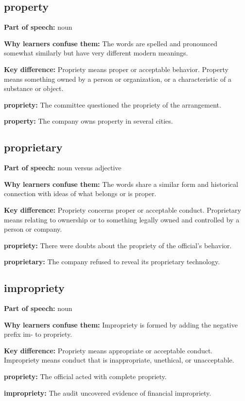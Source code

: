 \documentclass[11pt]{article}
\begin{document}
\subsection{property}
\textbf{Part of speech:} noun

\textbf{Why learners confuse them:} The words are spelled and pronounced somewhat similarly but have very different modern meanings.

\textbf{Key difference:} Propriety means proper or acceptable behavior. Property means something owned by a person or organization, or a characteristic of a substance or object.

\textbf{propriety:} The committee questioned the propriety of the arrangement.

\textbf{property:} The company owns property in several cities.

\subsection{proprietary}
\textbf{Part of speech:} noun versus adjective

\textbf{Why learners confuse them:} The words share a similar form and historical connection with ideas of what belongs or is proper.

\textbf{Key difference:} Propriety concerns proper or acceptable conduct. Proprietary means relating to ownership or to something legally owned and controlled by a person or company.

\textbf{propriety:} There were doubts about the propriety of the official's behavior.

\textbf{proprietary:} The company refused to reveal its proprietary technology.

\subsection{impropriety}
\textbf{Part of speech:} noun

\textbf{Why learners confuse them:} Impropriety is formed by adding the negative prefix im- to propriety.

\textbf{Key difference:} Propriety means appropriate or acceptable conduct. Impropriety means conduct that is inappropriate, unethical, or unacceptable.

\textbf{propriety:} The official acted with complete propriety.

\textbf{impropriety:} The audit uncovered evidence of financial impropriety.
\end{document}

